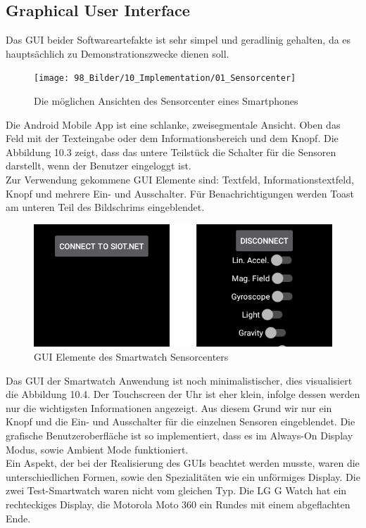 \subsection{Graphical User Interface}
Das \gls{GUI} beider Softwareartefakte ist sehr simpel und geradlinig gehalten, da es hauptsächlich zu Demonstrationszwecke dienen soll.
\begin{figure}[H]
  \centering
  \texttt{[image: 98\_Bilder/10\_Implementation/01\_Sensorcenter]}
  \caption[siot.net Sensorcenter Smartphone Screens]{Die möglichen Ansichten des Sensorcenter eines Smartphones}
\end{figure}
Die Android Mobile App ist eine schlanke, zweisegmentale Ansicht. Oben das Feld mit der Texteingabe oder dem Informationsbereich und dem Knopf. Die Abbildung 10.3 zeigt, dass das untere Teilstück die Schalter für die Sensoren darstellt, wenn der Benutzer eingeloggt ist.\\
Zur Verwendung gekommene \gls{GUI} Elemente sind: Textfeld, Informationstextfeld, Knopf und mehrere Ein- und Ausschalter. Für Benachrichtigungen werden Toast am unteren Teil des Bildschrims eingeblendet.
\begin{figure}[H]
  \centering
  \includegraphics[scale=0.5]{98_Bilder/10_Implementation/02_Sensorcenter}
  \caption[siot.net Sensorcenter Smartwatch Screens]{GUI Elemente des Smartwatch Sensorcenters}
\end{figure}
Das \gls{GUI} der Smartwatch Anwendung ist noch minimalistischer, dies visualisiert die Abbildung 10.4. Der Touchscreen der Uhr ist eher klein, infolge dessen werden nur die wichtigsten Informationen angezeigt. Aus diesem Grund wir nur ein Knopf und die Ein- und Ausschalter für die einzelnen Sensoren eingeblendet. Die grafische Benutzeroberfläche ist so implementiert, dass es im Always-On Display Modus, sowie Ambient Mode funktioniert.\\
Ein Aspekt, der bei der Realisierung des \gls{GUI}s beachtet werden musste, waren die unterschiedlichen Formen, sowie den Spezialitäten wie ein unförmiges Display. Die zwei Test-Smartwatch waren nicht vom gleichen Typ. Die LG G Watch hat ein rechteckiges Display, die Motorola Moto 360 ein Rundes mit einem abgeflachten Ende.

